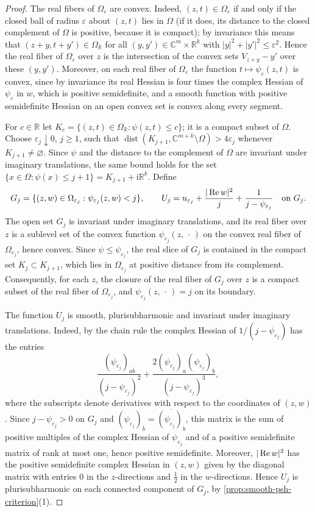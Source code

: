 \begin{proof}
The real fibers of $\Omega_\varepsilon$ are convex. Indeed, $(z,t)\in\Omega_\varepsilon$ if and only if the closed ball of radius $\varepsilon$ about $(z,t)$ lies in $\Omega$ (if it does, its distance to the closed complement of $\Omega$ is positive, because it is compact); by invariance this means that $(z+y,t+y')\in\Omega_{\mathbb R}$ for all $(y,y')\in\mathbb{C}^m\times\mathbb R^k$ with $|y|^2+|y'|^2\leq\varepsilon^2$. Hence the real fiber of $\Omega_\varepsilon$ over $z$ is the intersection of the convex sets $V_{z+y}-y'$ over these $(y,y')$. Moreover, on each real fiber of $\Omega_\varepsilon$ the function $t\mapsto\psi_\varepsilon(z,t)$ is convex, since by invariance its real Hessian is four times the complex Hessian of $\psi_\varepsilon$ in $w$, which is positive semidefinite, and a smooth function with positive semidefinite Hessian on an open convex set is convex along every segment.

For $c\in\mathbb R$ let $K_c=\{(z,t)\in\Omega_{\mathbb R}:\psi(z,t)\le c\}$; it is a compact subset of $\Omega$. Choose $\varepsilon_j\downarrow0$, $j\geq1$, such that $\operatorname{dist}(K_{j+1},\mathbb{C}^{m+k}\setminus\Omega)>4\varepsilon_j$ whenever $K_{j+1}\neq\varnothing$. Since $\psi$ and the distance to the complement of $\Omega$ are invariant under imaginary translations, the same bound holds for the set $\{x\in\Omega:\psi(x)\leq j+1\}=K_{j+1}+\mathrm{i}\mathbb R^k$. Define
\[
 G_j=\{(z,w)\in\Omega_{\varepsilon_j}:\psi_{\varepsilon_j}(z,w)<j\},\qquad
 U_j=u_{\varepsilon_j}+\frac{|\operatorname{Re} w|^2}{j}
       +\frac{1}{j-\psi_{\varepsilon_j}}\quad\text{on }G_j.
\]
The open set $G_j$ is invariant under imaginary translations, and its real fiber over $z$ is a sublevel set of the convex function $\psi_{\varepsilon_j}(z,\,\cdot\,)$ on the convex real fiber of $\Omega_{\varepsilon_j}$, hence convex. Since $\psi\leq\psi_{\varepsilon_j}$, the real slice of $G_j$ is contained in the compact set $K_j\subset K_{j+1}$, which lies in $\Omega_{\varepsilon_j}$ at positive distance from its complement. Consequently, for each $z$, the closure of the real fiber of $G_j$ over $z$ is a compact subset of the real fiber of $\Omega_{\varepsilon_j}$, and $\psi_{\varepsilon_j}(z,\,\cdot\,)=j$ on its boundary.

The function $U_j$ is smooth, plurisubharmonic and invariant under imaginary translations. Indeed, by the chain rule the complex Hessian of $1/(j-\psi_{\varepsilon_j})$ has the entries
\[
 \frac{(\psi_{\varepsilon_j})_{a\bar b}}{(j-\psi_{\varepsilon_j})^2}
 +\frac{2(\psi_{\varepsilon_j})_a(\psi_{\varepsilon_j})_{\bar b}}{(j-\psi_{\varepsilon_j})^3},
\]
where the subscripts denote derivatives with respect to the coordinates of $(z,w)$. Since $j-\psi_{\varepsilon_j}>0$ on $G_j$ and $(\psi_{\varepsilon_j})_{\bar b}=\overline{(\psi_{\varepsilon_j})_b}$, this matrix is the sum of positive multiples of the complex Hessian of $\psi_{\varepsilon_j}$ and of a positive semidefinite matrix of rank at most one, hence positive semidefinite. Moreover, $|\operatorname{Re} w|^2$ has the positive semidefinite complex Hessian in $(z,w)$ given by the diagonal matrix with entries $0$ in the $z$-directions and $\frac12$ in the $w$-directions. Hence $U_j$ is plurisubharmonic on each connected component of $G_j$, by \cref{prop:smooth-psh-criterion}(1).


\end{proof}
